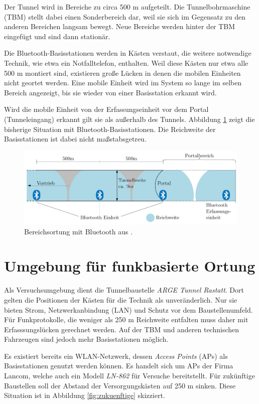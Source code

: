 Der Tunnel wird in Bereiche zu circa 500 m aufgeteilt. 
Die Tunnelbohrmaschine (TBM) stellt dabei einen Sonderbereich dar, weil sie sich im Gegensatz zu den anderen Bereichen langsam bewegt. 
Neue Bereiche werden hinter der TBM eingefügt und sind dann stationär.

Die Bluetooth-Basisstationen werden in Kästen verstaut, die weitere notwendige Technik, wie etwa ein Notfalltelefon, enthalten.
Weil diese Kästen nur etwa alle 500 m montiert sind, existieren große Lücken in denen die mobilen Einheiten nicht geortet werden.
Eine mobile Einheit wird im System so lange im selben Bereich angezeigt, bis sie wieder von einer Basisstation erkannt wird.

Wird die mobile Einheit von der Erfassungseinheit vor dem Portal (Tunneleingang) erkannt gilt sie als außerhalb des Tunnels.
Abbildung \ref{fig:bisherige} zeigt die bisherige Situation mit Bluetooth-Basisstationen. 
Die Reichweite der Basisstationen ist dabei nicht maßstabsgetreu.

\begin{figure}[h]
  \centering
	\includegraphics[width=\textwidth]{images/bisherige.png}
  \caption{Bereichsortung mit Bluetooth aus \cite{maurer2016unterstuetzung}.}
  \label{fig:bisherige}
\end{figure}

 
\section{Umgebung für funkbasierte Ortung}
Als Versuchsumgebung dient die Tunnelbaustelle \emph{ARGE Tunnel Rastatt}.
Dort gelten die Positionen der Kästen für die Technik als unveränderlich.
Nur sie bieten Strom, Netzwerkanbindung (LAN) und Schutz vor dem Baustellenumfeld.
Für Funkprotokolle, die weniger als 250 m Reichweite entfalten muss daher mit Erfasssungslücken gerechnet werden.
Auf der TBM und anderen technischen Fahrzeugen sind jedoch mehr Basisstationen möglich.

Es existiert bereits ein WLAN-Netzwerk, dessen \emph{Access Points} (APs) als Basisstationen genutzt werden können.
Es handelt sich um APs der Firma Lancom, welche auch ein Modell \emph{LN-862} für Versuche bereitstellt.
Für zukünftige Baustellen soll der Abstand der Versorgungskästen auf 250 m sinken. 
Diese Situation ist in Abbildung \ref{fig:zukuenftige} skizziert.

